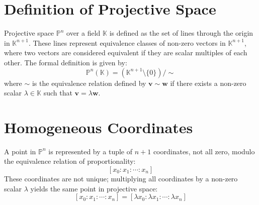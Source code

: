 \documentclass[11pt,openany]{article}
\begin{document}
%		
%		
%		
%		
%		

\iffalse
\section*{Definition of Projective Space}

Projective space \( \mathbb{P}^n \) over a field \( \mathbb{K} \) is defined as the set of lines through the origin in \( \mathbb{K}^{n+1} \). These lines represent equivalence classes of non-zero vectors in \( \mathbb{K}^{n+1} \), where two vectors are considered equivalent if they are scalar multiples of each other. The formal definition is given by:
\[
\mathbb{P}^n(\mathbb{K}) = ( \mathbb{K}^{n+1} \setminus \{0\} ) / \sim
\]
where \( \sim \) is the equivalence relation defined by \( \mathbf{v} \sim \mathbf{w} \) if there exists a non-zero scalar \( \lambda \in \mathbb{K} \) such that \( \mathbf{v} = \lambda \mathbf{w} \).

\section*{Homogeneous Coordinates}

A point in \( \mathbb{P}^n \) is represented by a tuple of \( n+1 \) coordinates, not all zero, modulo the equivalence relation of proportionality:
\[
[x_0: x_1: \cdots : x_n]
\]
These coordinates are not unique; multiplying all coordinates by a non-zero scalar \( \lambda \) yields the same point in projective space:
\[
[x_0: x_1: \cdots : x_n] = [\lambda x_0: \lambda x_1: \cdots : \lambda x_n]
\]
\end{document}
